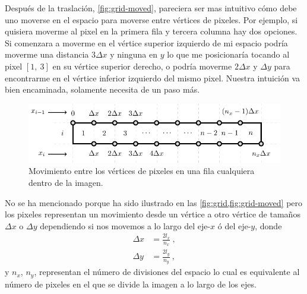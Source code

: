 Después de la traslación, \cref{fig:grid-moved}, pareciera ser mas intuitivo cómo debe uno moverse en el espacio para moverse entre vértices de pixeles. Por ejemplo, si quisiera moverme al pixel en la primera fila y tercera columna hay dos opciones. Si comenzara a moverme en el vértice superior izquierdo de mi espacio podría moverme una distancia $3 \Delta x$ y ninguna en $y$ lo que me posicionaría tocando al pixel $[1,\ 3]$ en su vértice superior derecho, o podría moverme $2 \Delta x$ y $\Delta y$ para encontrarme en el vértice inferior izquierdo del mismo pixel. Nuestra intuición va bien encaminada, solamente necesita de un paso más.
\begin{figure}[ht!]
    \centering
    \includegraphics[scale=0.75]{../figures/small-grid/small-grid}
    \caption{Movimiento entre los vértices de pixeles en una fila cualquiera dentro de la imagen.}
    \label{fig:small-grid}
\end{figure}

No se ha mencionado porque ha sido ilustrado en las \cref{fig:grid,fig:grid-moved} pero los pixeles representan un movimiento desde un vértice a otro vértice de tamaños $\Delta x$ o $\Delta y$ dependiendo si nos movemos a lo largo del eje-$x$ ó del eje-$y$, donde
\begin{equation*}
    \begin{split}
        \Delta x & = \frac{2 l_x}{n_x}\ , \\
        \Delta y & = \frac{2 l_y}{n_y}\ ,
    \end{split}
\end{equation*}
y $n_x$, $n_y$, representan el número de divisiones del espacio lo cual es equivalente al número de pixeles en el que se divide la imagen a lo largo de los ejes.


